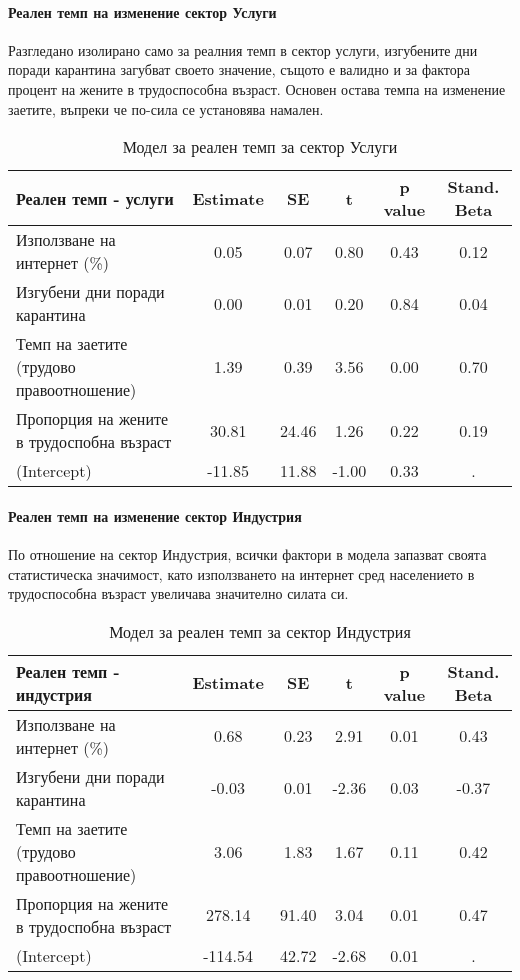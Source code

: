 \documentclass[a4paper,12pt]{article}
\begin{document}
\paragraph{Реален темп на изменение сектор Услуги }

Разгледано изолирано само за реалния темп в сектор услуги, изгубените дни поради карантина загубват своето значение, същото е валидно и за фактора процент на жените в трудоспособна възраст. Основен остава темпа на изменение заетите, въпреки че по-сила се установява намален.

\begin{table}[htbp]
	\centering
	\caption{Модел за реален темп за сектор Услуги}
	\begin{tabular}{lccccc}
		\toprule
		Реален темп - услуги & Estimate & SE    & t     & p value & Stand. Beta \\
		\midrule
		Използване на интернет (\%) & 0.05  & 0.07  & 0.80  & 0.43  & 0.12 \\
		Изгубени дни поради карантина  & 0.00  & 0.01  & 0.20  & 0.84  & 0.04 \\
		Темп на заетите (трудово правоотношение) & 1.39  & 0.39  & 3.56  & 0.00  & 0.70 \\
		Пропорция на жените в трудоспобна възраст  & 30.81 & 24.46 & 1.26  & 0.22  & 0.19 \\
		(Intercept) & -11.85 & 11.88 & -1.00 & 0.33  & . \\
		\bottomrule
	\end{tabular}%
	\label{tab:addlabel}%
\end{table}%

\paragraph{Реален темп на изменение сектор Индустрия}

По отношение на сектор Индустрия, всички фактори в модела запазват своята статистическа значимост, като използването на интернет сред населението в трудоспособна възраст увеличава значително силата си.

\begin{table}[htbp]
	\centering
	\caption{Модел за реален темп за сектор Индустрия}
	\begin{tabular}{lccccc}
		\toprule
		Реален темп - индустрия & Estimate & SE    & t     & p value & Stand. Beta \\
		\midrule
		Използване на интернет (\%) & 0.68  & 0.23  & 2.91  & 0.01  & 0.43 \\
		Изгубени дни поради карантина  & -0.03 & 0.01  & -2.36 & 0.03  & -0.37 \\
		Темп на заетите (трудово правоотношение) & 3.06  & 1.83  & 1.67  & 0.11  & 0.42 \\
		Пропорция на жените в трудоспобна възраст  & 278.14 & 91.40 & 3.04  & 0.01  & 0.47 \\
		(Intercept) & -114.54 & 42.72 & -2.68 & 0.01  & . \\
		\bottomrule
	\end{tabular}%
	\label{tab:addlabel}%
\end{table}%
\end{document}
